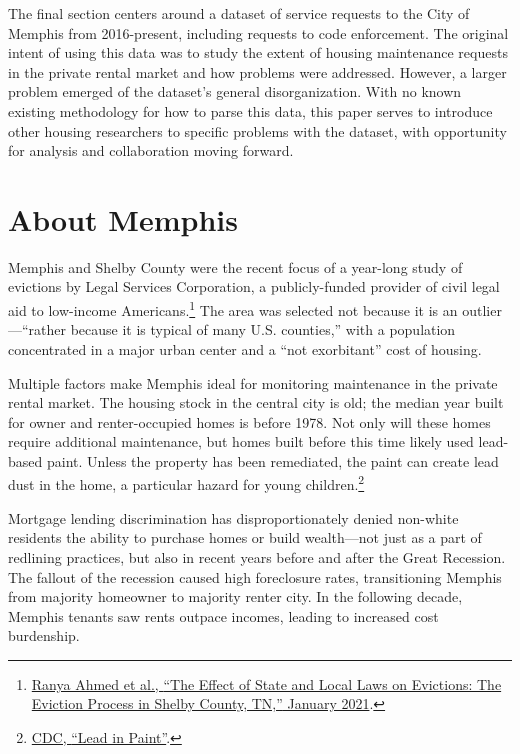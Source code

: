\documentclass[
  openany]{book}
\begin{document}
The final section centers around a dataset of service requests to the City of Memphis from 2016-present, including requests to code enforcement. The original intent of using this data was to study the extent of housing maintenance requests in the private rental market and how problems were addressed. However, a larger problem emerged of the dataset's general disorganization. With no known existing methodology for how to parse this data, this paper serves to introduce other housing researchers to specific problems with the dataset, with opportunity for analysis and collaboration moving forward.

\hypertarget{about-memphis}{%
\chapter{About Memphis}\label{about-memphis}}

Memphis and Shelby County were the recent focus of a year-long study of evictions by Legal Services Corporation, a publicly-funded provider of civil legal aid to low-income Americans.\footnote{\protect\hyperlink{ref-ahmed2021}{Ranya Ahmed et al., {``The Effect of State and Local Laws on Evictions: The Eviction Process in Shelby County, TN,''} January 2021}.} The area was selected not because it is an outlier---``rather because it is typical of many U.S. counties,'' with a population concentrated in a major urban center and a ``not exorbitant'' cost of housing.

Multiple factors make Memphis ideal for monitoring maintenance in the private rental market. The housing stock in the central city is old; the median year built for owner and renter-occupied homes is before 1978. Not only will these homes require additional maintenance, but homes built before this time likely used lead-based paint. Unless the property has been remediated, the paint can create lead dust in the home, a particular hazard for young children.\footnote{\protect\hyperlink{ref-cdc2020}{CDC, {``Lead in Paint''}}.}

Mortgage lending discrimination has disproportionately denied non-white residents the ability to purchase homes or build wealth---not just as a part of redlining practices, but also in recent years before and after the Great Recession. The fallout of the recession caused high foreclosure rates, transitioning Memphis from majority homeowner to majority renter city. In the following decade, Memphis tenants saw rents outpace incomes, leading to increased cost burdenship.
\end{document}
